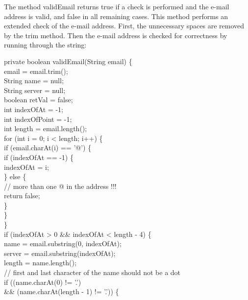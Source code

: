 The method {\meth validEmail} returns true if a check is performed and the
e-mail address is valid, and false in all remaining cases. This method
performs an extended check of the e-mail address. First, the unnecessary
spaces are removed by the trim method. Then the e-mail address is
checked for correctness by running through the string:

\begin{java}
private boolean validEmail(String email) \{\\
\jtabc        email = email.trim();\\
\jtabc        String name = null;\\
\jtabc        String server = null;\\
\jtabc        boolean retVal = false;\\
\jtabc        int indexOfAt = -1;\\
\jtabc        int indexOfPoint = -1;\\
\jtabc        int length = email.length();\\
\jtabc        for (int i = 0; i < length; i++) \{\\
\jtabe                if (email.charAt(i) == '@') \{\\
\jtabf                        if (indexOfAt == -1) \{\\
\jtabf                                indexOfAt = i;\\
\jtabf                        \} else \{\\
\jtabf                        // more than one @ in the address !!!\\
\jtabf                        return false;\\
\jtabf                        \}\\
\jtabe                \}\\
\jtabc        \}\\
\jtabc        if (indexOfAt > 0 \&\& indexOfAt < length - 4) \{\\
\jtabe                name = email.substring(0, indexOfAt);\\
\jtabe                server = email.substring(indexOfAt);\\
\jtabe                length = name.length();\\
\jtabe                // first and last character of the name should not be a dot\\
\jtabe                if ((name.charAt(0) != '.')\\
\jtabf                        \&\& (name.charAt(length - 1) != '.')) \{\\

\end{java}
